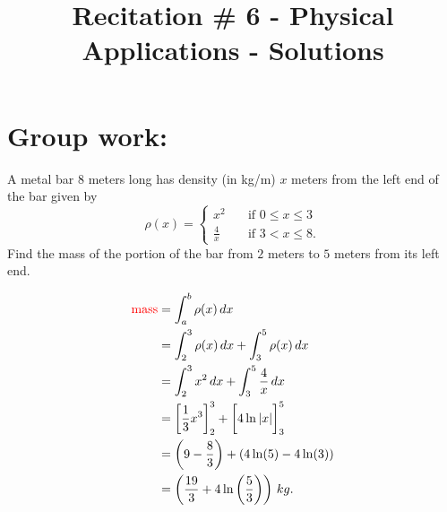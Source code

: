 \documentclass[noinstructornotes]{ximera}
\title{Recitation \# 6 - Physical Applications - Solutions}
\begin{document}
\begin{abstract}		\end{abstract}
\maketitle

\section{Group work:}



\begin{problem}
A metal bar $8$ meters long has density (in kg/m) $x$ meters from the left end of the bar given by
	\begin{equation*}
	\rho(x) = \left\{ \begin{array}{rl} x^2 & \quad \text{if } 0 \leq x \leq 3 \\ \frac{4}{x} & \quad \text{if } 3 < x \leq 8. \end{array} \right.  
	\end{equation*}
Find the mass of the portion of the bar from $2$ meters to $5$ meters from its left end.
	
	\begin{freeResponse}
		\begin{align*}
		\text{{\color{red} mass}} &= \int_a^b \rho(x) \,d x  \\
		&= \int_2^3 \rho(x) \,d x + \int_3^5 \rho(x) \,d x  \\
		&= \int_2^3 x^2 \,d x + \int_3^5 \frac{4}{x} \,d x  \\
		&= \bigg[ \frac{1}{3} x^3 \bigg]_2^3 + \bigg[ 4 \ln|x| \bigg]_3^5  \\
		&= \left( 9 - \frac{8}{3} \right) + \left(4 \ln (5) - 4 \ln (3) \right)  \\
		&= \left( \frac{19}{3} + 4 \ln \left( \frac{5}{3} \right) \right) \, kg.
		\end{align*}
	\end{freeResponse}
	
\end{problem}
\end{document}
